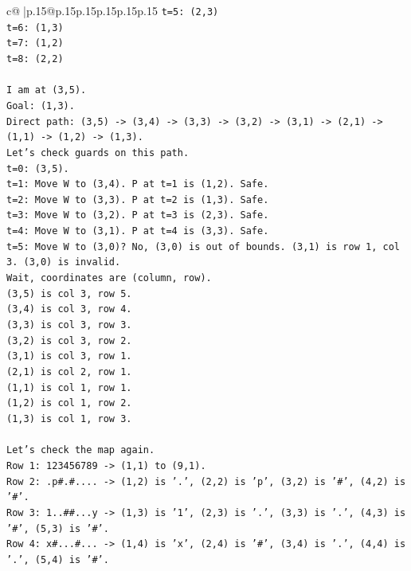 \documentclass{article}
\begin{document}
{\begin{supertabular}{c@{$\;$}|p{.15\linewidth}@{}p{.15\linewidth}p{.15\linewidth}p{.15\linewidth}p{.15\linewidth}p{.15\linewidth}}
{{{\texttt{t=5: (2,3)} \\
\texttt{t=6: (1,3)} \\
\texttt{t=7: (1,2)} \\
\texttt{t=8: (2,2)} \\
\\ 
\texttt{I am at (3,5).} \\
\texttt{Goal: (1,3).} \\
\texttt{Direct path: (3,5) {-}> (3,4) {-}> (3,3) {-}> (3,2) {-}> (3,1) {-}> (2,1) {-}> (1,1) {-}> (1,2) {-}> (1,3).} \\
\texttt{Let's check guards on this path.} \\
\texttt{t=0: (3,5).} \\
\texttt{t=1: Move W to (3,4). P at t=1 is (1,2). Safe.} \\
\texttt{t=2: Move W to (3,3). P at t=2 is (1,3). Safe.} \\
\texttt{t=3: Move W to (3,2). P at t=3 is (2,3). Safe.} \\
\texttt{t=4: Move W to (3,1). P at t=4 is (3,3). Safe.} \\
\texttt{t=5: Move W to (3,0)? No, (3,0) is out of bounds. (3,1) is row 1, col 3. (3,0) is invalid.} \\
\texttt{Wait, coordinates are (column, row).} \\
\texttt{(3,5) is col 3, row 5.} \\
\texttt{(3,4) is col 3, row 4.} \\
\texttt{(3,3) is col 3, row 3.} \\
\texttt{(3,2) is col 3, row 2.} \\
\texttt{(3,1) is col 3, row 1.} \\
\texttt{(2,1) is col 2, row 1.} \\
\texttt{(1,1) is col 1, row 1.} \\
\texttt{(1,2) is col 1, row 2.} \\
\texttt{(1,3) is col 1, row 3.} \\
\\ 
\texttt{Let's check the map again.} \\
\texttt{Row 1: 123456789 {-}> (1,1) to (9,1).} \\
\texttt{Row 2: .p\#.\#.... {-}> (1,2) is '.', (2,2) is 'p', (3,2) is '\#', (4,2) is '\#'.} \\
\texttt{Row 3: 1..\#\#...y {-}> (1,3) is '1', (2,3) is '.', (3,3) is '.', (4,3) is '\#', (5,3) is '\#'.} \\
\texttt{Row 4: x\#...\#... {-}> (1,4) is 'x', (2,4) is '\#', (3,4) is '.', (4,4) is '.', (5,4) is '\#'.} \\
}}}
\end{supertabular}}
\end{document}
